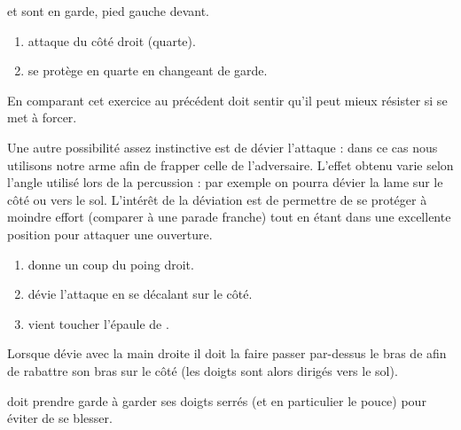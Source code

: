 \begin{exercice}

	\A et \D sont en garde, pied gauche devant.

	\begin{enumerate}
		\item \A attaque \D du côté droit (quarte).
		
		\item \D se protège en quarte en changeant de garde.
	\end{enumerate}

	En comparant cet exercice au précédent \D doit sentir qu'il peut mieux résister si \A se met à forcer.
\end{exercice}


Une autre possibilité assez instinctive est de dévier l'attaque : dans ce cas nous utilisons notre arme afin de frapper celle de l'adversaire.
L'effet obtenu varie selon l'angle utilisé lors de la percussion : par exemple on pourra dévier la lame sur le côté ou vers le sol.
L'intérêt de la déviation est de permettre de se protéger à moindre effort (comparer à une parade franche) tout en étant dans une excellente position pour attaquer une ouverture.


\begin{exercice}
	
	

	\begin{enumerate}
		\item \A donne un coup du poing droit.
		
		\item \D dévie l'attaque en se décalant sur le côté.
		
		\item \D vient toucher l'épaule de \A.
	\end{enumerate}

	Lorsque \D dévie avec la main droite il doit la faire passer par-dessus le bras de \A afin de rabattre son bras sur le côté (les doigts sont alors dirigés vers le sol).

	\D doit prendre garde à garder ses doigts serrés (et en particulier le pouce) pour éviter de se blesser.
\end{exercice}

